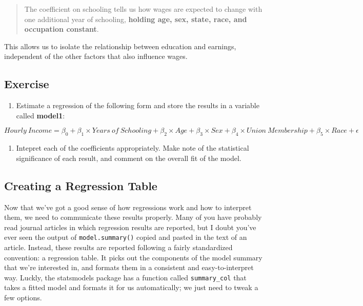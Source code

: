\documentclass[
  letterpaper,
  DIV=11,
  numbers=noendperiod]{scrreprt}
\providecommand{\tightlist}{%
  \setlength{\itemsep}{0pt}\setlength{\parskip}{0pt}}\usepackage{longtable,booktabs,array}
\begin{document}
\begin{quote}
The coefficient on schooling tells us how wages are expected to change
with one additional year of schooling, \textbf{holding age, sex, state,
race, and occupation constant}.
\end{quote}

This allows us to isolate the relationship between education and
earnings, independent of the other factors that also influence wages.

\hypertarget{exercise-23}{%
\subsection{Exercise}\label{exercise-23}}

\begin{enumerate}
\def\labelenumi{\arabic{enumi}.}
\tightlist
\item
  Estimate a regression of the following form and store the results in a
  variable called \textbf{model1}:
\end{enumerate}

\[Hourly\ Income= \beta_0 + \beta_1 \times Years\ of\ Schooling + \beta_2 \times Age + \beta_3 \times Sex + \beta_4 \times Union\ Membership + \beta_5 \times Race +\epsilon \]

\begin{enumerate}
\def\labelenumi{\arabic{enumi}.}
\setcounter{enumi}{1}
\tightlist
\item
  Intepret each of the coefficients appropriately. Make note of the
  statistical significance of each result, and comment on the overall
  fit of the model.
\end{enumerate}

\hypertarget{creating-a-regression-table}{%
\subsection{Creating a Regression
Table}\label{creating-a-regression-table}}

Now that we've got a good sense of how regressions work and how to
interpret them, we need to communicate these results properly. Many of
you have probably read journal articles in which regression results are
reported, but I doubt you've ever seen the output of
\texttt{model.summary()} copied and pasted in the text of an article.
Instead, these results are reported following a fairly standardized
convention: a regression table. It picks out the components of the model
summary that we're interested in, and formats them in a consistent and
easy-to-interpret way. Luckly, the statsmodels package has a function
called \texttt{summary\_col} that takes a fitted model and formats it
for us automatically; we just need to tweak a few options.
\end{document}
